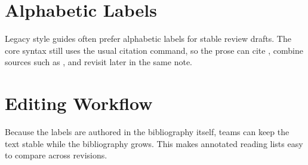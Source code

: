 \documentclass{article}
\begin{document}
\section{Alphabetic Labels}
Legacy style guides often prefer alphabetic labels for stable review drafts.
The core syntax still uses the usual citation command, so the prose can cite
\cite{knuth84}, combine sources such as \cite{lam94,hoare69}, and revisit
\cite{bentley86} later in the same note.

\section{Editing Workflow}
Because the labels are authored in the bibliography itself, teams can keep the
text stable while the bibliography grows. This makes annotated reading lists
easy to compare across revisions.


\end{document}
